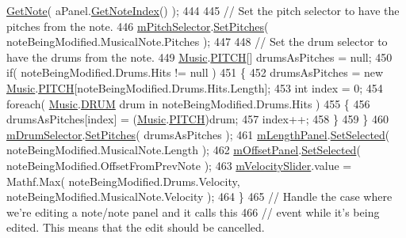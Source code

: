 \begin{DoxyCode}
      \hyperlink{group___song_pub_func_ga485c83c9278103fed23c532bba1252f0}{GetNote}( aPanel.\hyperlink{group___s_c___n_d_p_unity_ga8beef050026ade4ba4ccb574c414d24e}{GetNoteIndex}() );
444 
445             \textcolor{comment}{// Set the pitch selector to have the pitches from the note.}
446             \hyperlink{group___s_c_m_priv_var_gab84821120cace4099edfb42c52d2af63}{mPitchSelector}.\hyperlink{group___s_c___p_s_c_pub_func_ga0b85aab924084ebb49be4f64ad6f81e5}{SetPitches}( noteBeingModified.MusicalNote.Pitches );
447 
448             \textcolor{comment}{// Set the drum selector to have the drums from the note.}
449             \hyperlink{class_music}{Music}.\hyperlink{group___music_enums_ga508f69b199ea518f935486c990edac1d}{PITCH}[] drumsAsPitches = null;
450             \textcolor{keywordflow}{if}( noteBeingModified.Drums.Hits != null )
451             \{
452                 drumsAsPitches = \textcolor{keyword}{new} \hyperlink{class_music}{Music}.\hyperlink{group___music_enums_ga508f69b199ea518f935486c990edac1d}{PITCH}[noteBeingModified.Drums.Hits.Length];
453                 \textcolor{keywordtype}{int} index = 0;
454                 \textcolor{keywordflow}{foreach}( \hyperlink{class_music}{Music}.\hyperlink{group___music_enums_gade475b4382c7066d1af13e7c13c029b6}{DRUM} drum in noteBeingModified.Drums.Hits )
455                 \{
456                     drumsAsPitches[index] = (\hyperlink{class_music}{Music}.\hyperlink{group___music_enums_ga508f69b199ea518f935486c990edac1d}{PITCH})drum;
457                     index++;
458                 \}
459             \}
460             \hyperlink{group___s_c_m_priv_var_gac8be873b8259a0ddf76b4fa6d7d2d072}{mDrumSelector}.\hyperlink{group___s_c___p_s_c_pub_func_ga0b85aab924084ebb49be4f64ad6f81e5}{SetPitches}( drumsAsPitches );
461             \hyperlink{group___s_c_m_priv_var_gadb8dedf80fbe474a1c94cdc95d088a6f}{mLengthPanel}.\hyperlink{group___s_c_m_nest_class_ab3d74be007528e4e6686f89e8e993b3b}{SetSelected}( noteBeingModified.MusicalNote.Length );
462             \hyperlink{group___s_c_m_priv_var_ga86a44007a4b127d7aa61f75dd34a3409}{mOffsetPanel}.\hyperlink{group___s_c_m_nest_class_ab3d74be007528e4e6686f89e8e993b3b}{SetSelected}( noteBeingModified.OffsetFromPrevNote );
463             \hyperlink{group___s_c_m_priv_var_ga7316e5e8f15d1574fc6cb4bd739bbf0a}{mVelocitySlider}.value = Mathf.Max( noteBeingModified.Drums.Velocity, 
      noteBeingModified.MusicalNote.Velocity );
464         \}
465         \textcolor{comment}{// Handle the case where we're editing a note/note panel and it calls this }
466         \textcolor{comment}{// event while it's being edited. This means that the edit should be cancelled.}

\end{DoxyCode}
